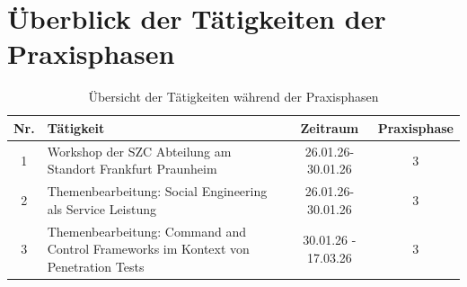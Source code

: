 \documentclass{article}
\begin{document}
{\Large
\renewcommand{\arraystretch}{1.5}
\section*{Überblick der Tätigkeiten der Praxisphasen}
\begin{table}[h]
\centering
\begin{tabularx}{\textwidth}{|c|X|c|c|}
\hline
\textbf{Nr.} & \textbf{Tätigkeit} & \textbf{Zeitraum} & \textbf{Praxisphase} \\
\hline
1 & Workshop der SZC Abteilung am Standort Frankfurt Praunheim & 26.01.26-30.01.26 & 3\\
2 & Themenbearbeitung: Social Engineering als Service Leistung & 26.01.26-30.01.26 & 3\\
3 & Themenbearbeitung: Command and Control Frameworks im Kontext von Penetration Tests & 30.01.26 - 17.03.26 & 3\\
\hline
\end{tabularx}
\caption{Übersicht der Tätigkeiten während der Praxisphasen}
\label{tab:Taetigkeiten der 3. Praxisphase}
\end{table}
}
\newpage
%
\newpage 
{}


\newpage

\newpage

\newpage

\newpage

\newpage

\newpage

\newpage
\printbibliography
\end{document}
